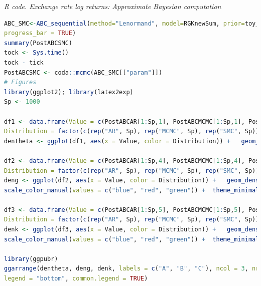 \begin{tcolorbox}[enhanced,width=4.67in,center upper,
	fontupper=\large\bfseries,drop shadow southwest,sharp corners]
	\textit{R code. Exchange rate log returns: Approximate Bayesian computation}
	\begin{VF}
		\begin{lstlisting}[language=R]
ABC_SMC<-ABC_sequential(method="Lenormand", model=RGKnewSum, prior=toy_prior, summary_stat_target=sum_stat_obs, nb_simul = 30000, alpha = 0.034, p_acc_min = 0.05,
progress_bar = TRUE)
summary(PostABCSMC)
tock <- Sys.time()
tock - tick
PostABCSMC <- coda::mcmc(ABC_SMC[["param"]])
# Figures 
library(ggplot2); library(latex2exp)
Sp <- 1000

df1 <- data.frame(Value = c(PostABCAR[1:Sp,1], PostABCMCMC[1:Sp,1], PostABCSMC[1:Sp,1]),
Distribution = factor(c(rep("AR", Sp), rep("MCMC", Sp), rep("SMC", Sp))))
dentheta <- ggplot(df1, aes(x = Value, color = Distribution)) +   geom_density(linewidth = 1) + labs(title = TeX("Posterior density plot: $theta$"), x = TeX("$theta$"), y = "Posterior density") + scale_color_manual(values = c("blue", "red", "green")) +  theme_minimal() + theme(legend.title = element_blank())

df2 <- data.frame(Value = c(PostABCAR[1:Sp,4], PostABCMCMC[1:Sp,4], PostABCSMC[1:Sp,4]),
Distribution = factor(c(rep("AR", Sp), rep("MCMC", Sp), rep("SMC", Sp))))
deng <- ggplot(df2, aes(x = Value, color = Distribution)) +   geom_density(linewidth = 1) + labs(title = "Posterior density plot: g", x = "g", y = "Posterior density") +
scale_color_manual(values = c("blue", "red", "green")) +  theme_minimal() + theme(legend.title = element_blank())

df3 <- data.frame(Value = c(PostABCAR[1:Sp,5], PostABCMCMC[1:Sp,5], PostABCSMC[1:Sp,5]),
Distribution = factor(c(rep("AR", Sp), rep("MCMC", Sp), rep("SMC", Sp))))
denk <- ggplot(df3, aes(x = Value, color = Distribution)) +   geom_density(linewidth = 1) + labs(title = "Posterior density plot: k", x = "k", y = "Posterior density") +
scale_color_manual(values = c("blue", "red", "green")) +  theme_minimal() + theme(legend.title = element_blank())

library(ggpubr)
ggarrange(dentheta, deng, denk, labels = c("A", "B", "C"), ncol = 3, nrow = 1,
legend = "bottom", common.legend = TRUE)
\end{lstlisting}
	\end{VF}
\end{tcolorbox}


